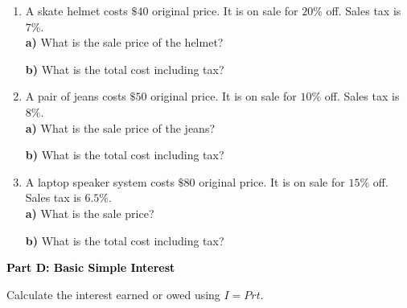 \documentclass[12pt, letterpaper, fleqn]{article}
\begin{document}
\begin{enumerate}[itemsep=1.5cm, leftmargin=0.6cm]
\item A skate helmet costs $\$40$ original price. It is on sale for $20\%$ off. Sales tax is $7\%$. \\
\textbf{a)} What is the sale price of the helmet?  \\
\vspace{1cm}

\textbf{b)} What is the total cost including tax? 
\vspace{1cm}

\item A pair of jeans costs $\$50$ original price. It is on sale for $10\%$ off. Sales tax is $8\%$. \\
\textbf{a)} What is the sale price of the jeans?  \\
\vspace{1cm}

\textbf{b)} What is the total cost including tax? 
\vspace{1cm}

\item A laptop speaker system costs $\$80$ original price. It is on sale for $15\%$ off. Sales tax is $6.5\%$. \\
\textbf{a)} What is the sale price?  \\
\vspace{1cm}

\textbf{b)} What is the total cost including tax? 
\vspace{1cm}
\end{enumerate}

\newpage

\begin{tcolorbox}[colback=black!10]
    \large\textcolor{black}{\textbf{Part D: Basic Simple Interest}}
\end{tcolorbox}

\vspace{3mm}

\noindent
Calculate the interest earned or owed using $I = Prt$.

\vspace{5mm}
\end{document}
